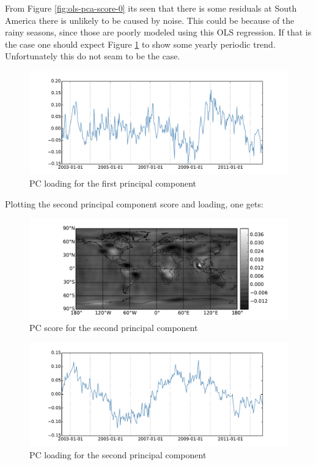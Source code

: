 From Figure \ref{fig:ols-pca-score-0} its seen that there is some residuals at South America there is unlikely to be caused by noise. This could be because of the rainy seasons, since those are poorly modeled using this OLS regression. If that is the case one should expect Figure \ref{fig:ols-pca-loading-0} to show some yearly periodic trend. Unfortunately this do not seam to be the case. 

\begin{figure}[H]
\centering
\includegraphics[width=1.0\textwidth]{figures/ols-pca-loading-0}
\caption{PC loading for the first principal component}
\label{fig:ols-pca-loading-0}
\end{figure}

Plotting the second principal component score and loading, one gets:
\begin{figure}[H]
\centering
\includegraphics[width=1.0\textwidth]{figures/ols-pca-score-1}
\caption{PC score for the second principal component}
\label{fig:ols-pca-score-1}
\end{figure}

\begin{figure}[H]
\centering
\includegraphics[width=1.0\textwidth]{figures/ols-pca-loading-1}
\caption{PC loading for the second principal component}
\label{fig:ols-pca-loading-1}
\end{figure}

